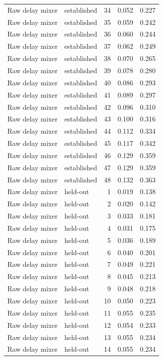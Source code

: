 \begin{tabular}{llrrr}
Raw delay mixer & established & 34 & 0.052 & 0.227 \\
Raw delay mixer & established & 35 & 0.059 & 0.242 \\
Raw delay mixer & established & 36 & 0.060 & 0.244 \\
Raw delay mixer & established & 37 & 0.062 & 0.249 \\
Raw delay mixer & established & 38 & 0.070 & 0.265 \\
Raw delay mixer & established & 39 & 0.078 & 0.280 \\
Raw delay mixer & established & 40 & 0.086 & 0.293 \\
Raw delay mixer & established & 41 & 0.089 & 0.297 \\
Raw delay mixer & established & 42 & 0.096 & 0.310 \\
Raw delay mixer & established & 43 & 0.100 & 0.316 \\
Raw delay mixer & established & 44 & 0.112 & 0.334 \\
Raw delay mixer & established & 45 & 0.117 & 0.342 \\
Raw delay mixer & established & 46 & 0.129 & 0.359 \\
Raw delay mixer & established & 47 & 0.129 & 0.359 \\
Raw delay mixer & established & 48 & 0.132 & 0.363 \\
Raw delay mixer & held-out & 1 & 0.019 & 0.138 \\
Raw delay mixer & held-out & 2 & 0.020 & 0.142 \\
Raw delay mixer & held-out & 3 & 0.033 & 0.181 \\
Raw delay mixer & held-out & 4 & 0.031 & 0.175 \\
Raw delay mixer & held-out & 5 & 0.036 & 0.189 \\
Raw delay mixer & held-out & 6 & 0.040 & 0.201 \\
Raw delay mixer & held-out & 7 & 0.049 & 0.221 \\
Raw delay mixer & held-out & 8 & 0.045 & 0.213 \\
Raw delay mixer & held-out & 9 & 0.048 & 0.218 \\
Raw delay mixer & held-out & 10 & 0.050 & 0.223 \\
Raw delay mixer & held-out & 11 & 0.055 & 0.235 \\
Raw delay mixer & held-out & 12 & 0.054 & 0.233 \\
Raw delay mixer & held-out & 13 & 0.055 & 0.234 \\
Raw delay mixer & held-out & 14 & 0.055 & 0.234 \\

\end{tabular}
